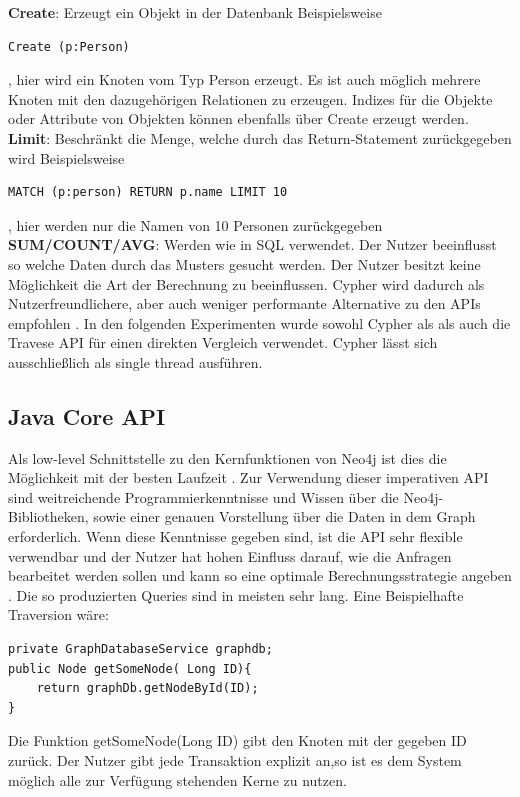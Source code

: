 \textbf{Create}: Erzeugt ein Objekt in der Datenbank Beispielsweise 
\begin{Verbatim}[frame=single]
Create (p:Person)
\end{Verbatim}
, hier wird ein Knoten vom Typ Person erzeugt. Es ist auch möglich mehrere Knoten mit den dazugehörigen Relationen zu erzeugen. Indizes  für die Objekte oder Attribute von Objekten können ebenfalls über Create erzeugt werden.\newline
\textbf{Limit}: Beschränkt die Menge, welche durch das Return-Statement zurückgegeben wird Beispielsweise
\begin{Verbatim}[frame=single]
 MATCH (p:person) RETURN p.name LIMIT 10
 \end{Verbatim} 
 , hier werden nur die Namen  von 10 Personen zurückgegeben\newline
\textbf{SUM/COUNT/AVG}: Werden wie in SQL verwendet. \newline
Der Nutzer beeinflusst so welche Daten durch  das Musters gesucht werden. Der Nutzer besitzt keine Möglichkeit die Art der Berechnung zu beeinflussen. Cypher wird dadurch als Nutzerfreundlichere, aber auch weniger performante Alternative zu den APIs empfohlen \parencite{vukotic2015neo4j}. In den folgenden Experimenten wurde sowohl Cypher als als auch die Travese API für einen direkten Vergleich verwendet. Cypher lässt sich ausschließlich als single thread ausführen.

\subsection{Java Core API}
Als low-level Schnittstelle zu den Kernfunktionen von Neo4j ist dies die Möglichkeit mit der besten Laufzeit \parencite{vukotic2015neo4j}. Zur Verwendung dieser imperativen API sind weitreichende Programmierkenntnisse und Wissen über die Neo4j-Bibliotheken, sowie einer genauen Vorstellung über die Daten in dem Graph erforderlich. Wenn diese Kenntnisse gegeben sind, ist die API sehr flexible verwendbar  und der Nutzer hat hohen Einfluss darauf, wie die Anfragen bearbeitet werden sollen und kann so eine optimale Berechnungsstrategie angeben \parencite{vukotic2015neo4j}. Die so produzierten Queries sind in meisten sehr lang. Eine Beispielhafte Traversion wäre:
\begin{Verbatim}[frame=single]
private GraphDatabaseService graphdb;
public Node getSomeNode( Long ID){ 
	return graphDb.getNodeById(ID);
}
\end{Verbatim}
Die Funktion getSomeNode(Long ID) gibt den Knoten mit der gegeben ID zurück. Der Nutzer gibt jede Transaktion explizit an,so ist es dem System möglich alle zur Verfügung stehenden Kerne zu nutzen.

